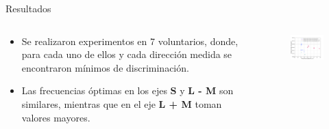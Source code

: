 \documentclass[
    11pt, %
    aspectratio=169, %
]{beamer}
\begin{document}
\begin{frame}{Resultados}
    \begin{columns}[c] %

    
		\begin{column}{0.50\textwidth}

    \begin{itemize}
        \item Se realizaron experimentos en 7 voluntarios, donde, para cada uno de ellos y cada dirección medida se encontraron mínimos de discriminación.
        \item Las frecuencias óptimas en los ejes $\mathbf{S}$ y \textbf{L - M} son similares, mientras que en el eje \textbf{L + M} toman valores mayores.
      
    \end{itemize}

                
		\end{column}
  		\begin{column}{0.50\textwidth} %
                 \begin{figure}[h!]
                    \centering
                    \includegraphics[angle=0, width=6.5cm]{Images/resultados/minimos_fondo_128_128_128.png}
                \end{figure}
		\end{column}		
	\end{columns}
\end{frame}
\end{document}
